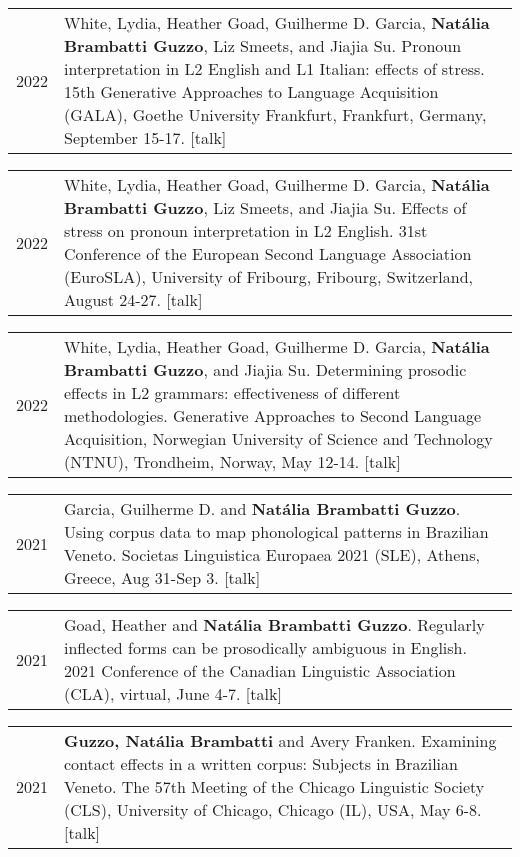 \documentclass[letterpaper,10pt]{article}
\begin{document}
\begin{tabular}{p{1cm}p{16cm}}
2022 & White, Lydia, Heather Goad, Guilherme D. Garcia, \textbf{Nat\'alia Brambatti Guzzo}, Liz Smeets, and Jiajia Su. Pronoun interpretation in L2 English and L1 Italian: effects of stress. 15th Generative Approaches to Language Acquisition (GALA), Goethe University Frankfurt, Frankfurt, Germany, September 15-17. [talk]
\end{tabular}



\begin{tabular}{p{1cm}p{16cm}}
2022 & White, Lydia, Heather Goad, Guilherme D. Garcia, \textbf{Nat\'alia Brambatti Guzzo}, Liz Smeets, and Jiajia Su. Effects of stress on pronoun interpretation in L2 English. 31st Conference of the European Second Language Association (EuroSLA), University of Fribourg, Fribourg, Switzerland, August 24-27. [talk]
\end{tabular}


\begin{tabular}{p{1cm}p{16cm}}
2022 & White, Lydia, Heather Goad, Guilherme D. Garcia, \textbf{Nat\'alia Brambatti Guzzo}, and Jiajia Su. Determining prosodic effects in L2 grammars:  effectiveness of different methodologies. Generative Approaches to Second Language Acquisition, Norwegian University of Science and Technology (NTNU), Trondheim, Norway, May 12-14. [talk]
\end{tabular}


\begin{tabular}{p{1cm}p{16cm}}
2021 & Garcia, Guilherme D. and \textbf{Nat\'alia Brambatti Guzzo}. Using corpus data to map phonological patterns in Brazilian Veneto. Societas Linguistica Europaea 2021 (SLE), Athens, Greece, Aug 31-Sep 3. [talk]
\end{tabular}

\begin{tabular}{p{1cm}p{16cm}}
2021 & Goad, Heather and \textbf{Nat\'alia Brambatti Guzzo}. Regularly inflected forms can be prosodically ambiguous in English. 2021 Conference of the Canadian Linguistic Association (CLA), virtual, June 4-7. [talk]
\end{tabular}

\begin{tabular}{p{1cm}p{16cm}}
2021 & \textbf{Guzzo, Nat\'alia Brambatti} and Avery Franken. Examining contact effects in a written corpus: Subjects in Brazilian Veneto. The 57th Meeting of the Chicago Linguistic Society (CLS), University of Chicago, Chicago (IL), USA, May 6-8. [talk]
\end{tabular}
\end{document}
